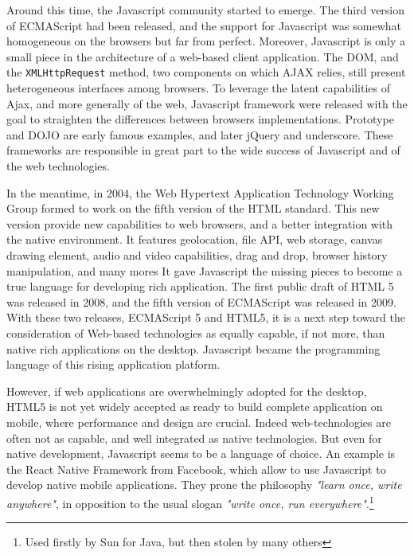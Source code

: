 Around this time, the Javascript community started to emerge.
The third version of ECMAScript had been released, and the support for Javascript was somewhat homogeneous on the browsers but far from perfect.
Moreover, Javascript is only a small piece in the architecture of a web-based client application.
The DOM, and the \texttt{XMLHttpRequest} method, two components on which AJAX relies, still present heterogeneous interfaces among browsers.
To leverage the latent capabilities of Ajax, and more generally of the web, Javascript framework were released with the goal to straighten the differences between browsers implementations.
Prototype and DOJO are early famous examples, and later jQuery and underscore.
These frameworks are responsible in great part to the wide success of Javascript and of the web technologies.

In the meantime, in 2004, the Web Hypertext Application Technology Working Group formed to work on the fifth version of the HTML standard.
This new version provide new capabilities to web browsers, and a better integration with the native environment.
It features geolocation, file API, web storage, canvas drawing element, audio and video capabilities, drag and drop, browser history manipulation, and many mores
It gave Javascript the missing pieces to become a true language for developing rich application.
The first public draft of HTML 5 was released in 2008, and the fifth version of ECMAScript was released in 2009.
With these two releases, ECMAScript 5 and HTML5, it is a next step toward the consideration of Web-based technologies as equally capable, if not more, than native rich applications on the desktop.
Javascript became the programming language of this rising application platform.

However, if web applications are overwhelmingly adopted for the desktop, HTML5 is not yet widely accepted as ready to build complete application on mobile, where performance and design are crucial.
Indeed web-technologies are often not as capable, and well integrated as native technologies.
But even for native development, Javascript seems to be a language of choice.
An example is the React Native Framework from Facebook, which allow to use Javascript to develop native mobile applications.
They prone the philosophy \textit{"learn once, write anywhere"}, in opposition to the usual slogan \textit{"write once, run everywhere"}.\footnote{Used firstly by Sun for Java, but then stolen by many others}

